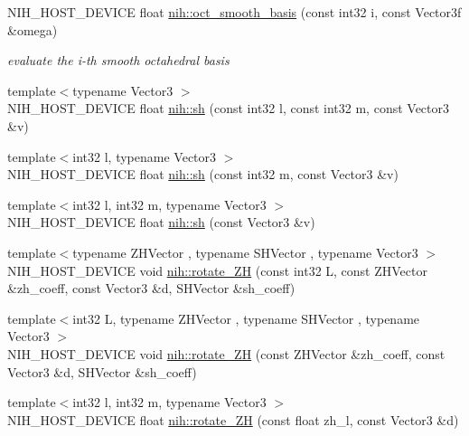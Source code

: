 \begin{DoxyCompactItemize}
\item 
\-N\-I\-H\-\_\-\-H\-O\-S\-T\-\_\-\-D\-E\-V\-I\-C\-E float \hyperlink{group__spherical__functions_ga3875de0131887e4c122d9f76aa6c1ef0}{nih\-::oct\-\_\-smooth\-\_\-basis} (const int32 i, const \-Vector3f \&omega)
\begin{DoxyCompactList}\small\item\em evaluate the i-\/th smooth octahedral basis \end{DoxyCompactList}\item 
{\footnotesize template$<$typename Vector3 $>$ }\\\-N\-I\-H\-\_\-\-H\-O\-S\-T\-\_\-\-D\-E\-V\-I\-C\-E float \hyperlink{group__spherical__functions_ga61b3dccbdbb3265ced8cfefc49c4f96c}{nih\-::sh} (const int32 l, const int32 m, const \-Vector3 \&v)
\item 
{\footnotesize template$<$int32 l, typename Vector3 $>$ }\\\-N\-I\-H\-\_\-\-H\-O\-S\-T\-\_\-\-D\-E\-V\-I\-C\-E float \hyperlink{group__spherical__functions_ga84c13afac74205bed1f5f3a382088394}{nih\-::sh} (const int32 m, const \-Vector3 \&v)
\item 
{\footnotesize template$<$int32 l, int32 m, typename Vector3 $>$ }\\\-N\-I\-H\-\_\-\-H\-O\-S\-T\-\_\-\-D\-E\-V\-I\-C\-E float \hyperlink{group__spherical__functions_ga093407ba5202540f5ca6cc3da2567970}{nih\-::sh} (const \-Vector3 \&v)
\item 
{\footnotesize template$<$typename Z\-H\-Vector , typename S\-H\-Vector , typename Vector3 $>$ }\\\-N\-I\-H\-\_\-\-H\-O\-S\-T\-\_\-\-D\-E\-V\-I\-C\-E void \hyperlink{group__spherical__functions_gac4367786c521d9b0e54b08dd27bcc391}{nih\-::rotate\-\_\-\-Z\-H} (const int32 \-L, const \-Z\-H\-Vector \&zh\-\_\-coeff, const \-Vector3 \&d, \-S\-H\-Vector \&sh\-\_\-coeff)
\item 
{\footnotesize template$<$int32 \-L, typename Z\-H\-Vector , typename S\-H\-Vector , typename Vector3 $>$ }\\\-N\-I\-H\-\_\-\-H\-O\-S\-T\-\_\-\-D\-E\-V\-I\-C\-E void \hyperlink{group__spherical__functions_gad3026df527a2ed22cead3594bdd25b19}{nih\-::rotate\-\_\-\-Z\-H} (const \-Z\-H\-Vector \&zh\-\_\-coeff, const \-Vector3 \&d, \-S\-H\-Vector \&sh\-\_\-coeff)
\item 
{\footnotesize template$<$int32 l, int32 m, typename Vector3 $>$ }\\\-N\-I\-H\-\_\-\-H\-O\-S\-T\-\_\-\-D\-E\-V\-I\-C\-E float \hyperlink{group__spherical__functions_ga0cea7b5e2aa00742a2e8d00af322edf3}{nih\-::rotate\-\_\-\-Z\-H} (const float zh\-\_\-l, const \-Vector3 \&d)
\end{DoxyCompactItemize}


